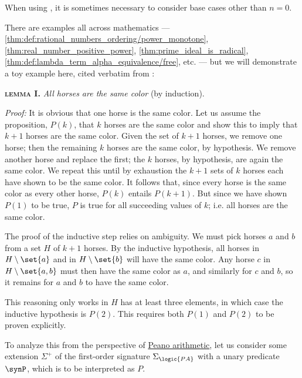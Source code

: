 \begin{remark}\label{rem:natural_number_induction_base}
  When using , it is sometimes necessary to consider base cases other than \( n = 0 \).

  There are examples all across mathematics --- \cref{thm:def:rational_numbers_ordering/power_monotone}, \cref{thm:real_number_positive_power}, \cref{thm:prime_ideal_is_radical}, \cref{thm:def:lambda_term_alpha_equivalence/free}, etc. --- but we will demonstrate a toy example here, cited verbatim from \cite{Cohen1961NatureOfMathematicalProofs}:
  \begin{displayquote}
    \textbf{\textsc{lemma I.}} \textit{All horses are the same color} (by induction).

    \quad \textit{Proof:} It is obvious that one horse is the same color. Let us assume the proposition, \( P(k) \), that \( k \) horses are the same color and show this to imply that \( k + 1 \) horses are the same color. Given the set of \( k + 1 \) horses, we remove one horse; then the remaining \( k \) horses are the same color, by hypothesis. We remove another horse and replace the first; the \( k \) horses, by hypothesis, are again the same color. We repeat this until by exhaustion the \( k + 1 \) sets of \( k \) horses each have shown to be the same color. It follows that, since every horse is the same color as every other horse, \( P(k) \) entails \( P(k + 1) \). But since we have shown \( P(1) \) to be true, \( P \) is true for all succeeding values of \( k \); i.e. all horses are the same color.
  \end{displayquote}

  The proof of the inductive step relies on ambiguity. We must pick horses \( a \) and \( b \) from a set \( H \) of \( k + 1 \) horses. By the inductive hypothesis, all horses in \( H \setminus \set{ a } \) and in \( H \setminus \set{ b } \) will have the same color. Any horse \( c \) in \( H \setminus \set{ a, b } \) must then have the same color as \( a \), and similarly for \( c \) and \( b \), so it remains for \( a \) and \( b \) to have the same color.

  This reasoning only works in \( H \) has at least three elements, in which case the inductive hypothesis is \( P(2) \). This requires both \( P(1) \) and \( P(2) \) to be proven explicitly.

  To analyze this from the perspective of \hyperref[def:peano_arithmetic]{Peano arithmetic}, let us consider some extension \( \Sigma^+ \) of the first-order signature \( \Sigma_{\logic{PA}} \) with a unary predicate \( \synP \), which is to be interpreted as \( P \).


\end{remark}
